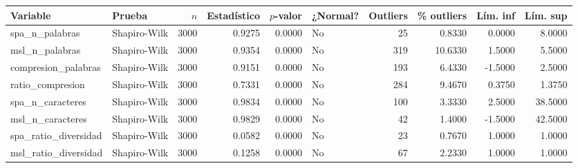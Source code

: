 \begin{tabular}{llrrrlrrrr}
\toprule
Variable & Prueba & $n$ & Estadístico & $p$-valor & ¿Normal? & Outliers & \% outliers & Lím. inf & Lím. sup \\
\midrule
spa\_n\_palabras & Shapiro-Wilk & 3000 & 0.9275 & 0.0000 & No & 25 & 0.8330 & 0.0000 & 8.0000 \\
msl\_n\_palabras & Shapiro-Wilk & 3000 & 0.9354 & 0.0000 & No & 319 & 10.6330 & 1.5000 & 5.5000 \\
compresion\_palabras & Shapiro-Wilk & 3000 & 0.9151 & 0.0000 & No & 193 & 6.4330 & -1.5000 & 2.5000 \\
ratio\_compresion & Shapiro-Wilk & 3000 & 0.7331 & 0.0000 & No & 284 & 9.4670 & 0.3750 & 1.3750 \\
spa\_n\_caracteres & Shapiro-Wilk & 3000 & 0.9834 & 0.0000 & No & 100 & 3.3330 & 2.5000 & 38.5000 \\
msl\_n\_caracteres & Shapiro-Wilk & 3000 & 0.9829 & 0.0000 & No & 42 & 1.4000 & -1.5000 & 42.5000 \\
spa\_ratio\_diversidad & Shapiro-Wilk & 3000 & 0.0582 & 0.0000 & No & 23 & 0.7670 & 1.0000 & 1.0000 \\
msl\_ratio\_diversidad & Shapiro-Wilk & 3000 & 0.1258 & 0.0000 & No & 67 & 2.2330 & 1.0000 & 1.0000 \\
\bottomrule
\end{tabular}

